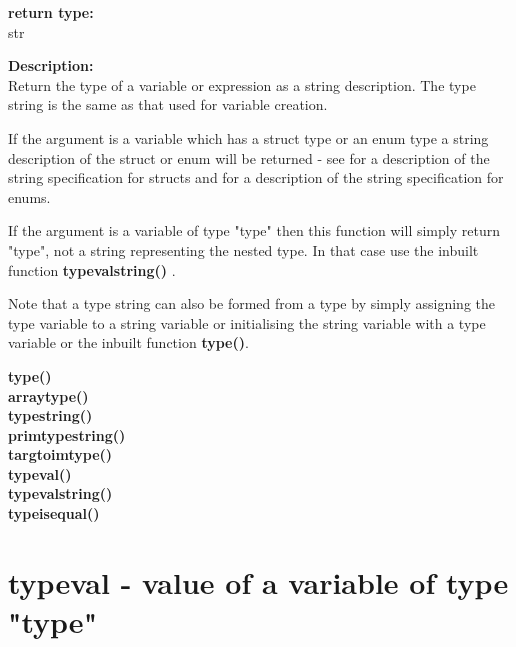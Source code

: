         {\bf return type:} \\
        str
        
        {\bf Description:} \\
        Return the type of a variable or expression as a string description.
        The type string is the same as that used for variable creation.
        
        If the argument is a variable which has a struct type or an enum type a
        string description of the struct or enum will be returned - see
         for a description of the string specification
        for structs and  for a description of the string
        specification for enums.
        
        If the argument is a variable of type "type" then this function will
        simply return "type", not a string representing the nested type. In that
        case use the inbuilt function {\bf typevalstring()}
        .
        
        Note that a type string can also be formed from a type by simply assigning
        the type variable to a string variable or initialising the string variable
        with a type variable or the inbuilt function {\bf type()}.
        
        
        {\bf type()}  \\
        {\bf arraytype()}  \\
        {\bf typestring()}  \\
        {\bf primtypestring()}  \\
        {\bf targtoimtype()}  \\
        {\bf typeval()}  \\
        {\bf typevalstring()}  \\
        {\bf typeisequal()}  \\


    \section{typeval - value of a variable of type "type"}\label{sec:iftypeval}
        
